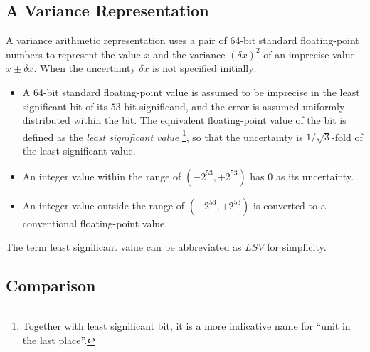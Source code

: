 \documentclass[twoside]{article}
\numberwithin{equation}{section}
\begin{document}
\subsection{A Variance Representation}

A variance arithmetic representation uses a pair of 64-bit standard floating-point numbers to represent the value $x$ and the variance $(\delta x)^2$ of an imprecise value $x \pm \delta x$.
When the uncertainty $\delta x$ is not specified initially:
\begin{itemize}
\item A 64-bit standard floating-point value is assumed to be imprecise in the least significant bit of its $53$-bit significand, and the error is assumed uniformly distributed within the bit.
The equivalent floating-point value of the bit is defined as the \emph{least significant value} \footnote{Together with least significant bit, it is a more indicative name for ``unit in the last place''.}, so that the uncertainty is $1/\sqrt{3}$-fold of the least significant value.

\item An integer value within the range of $(-2^{53}, +2^{53})$ has 0 as its uncertainty.

\item An integer value outside the range of $(-2^{53}, +2^{53})$ is converted to a conventional floating-point value.
\end{itemize}

The term least significant value can be abbreviated as $LSV$ for simplicity.

\subsection{Comparison}

\iffalse
\end{document}
